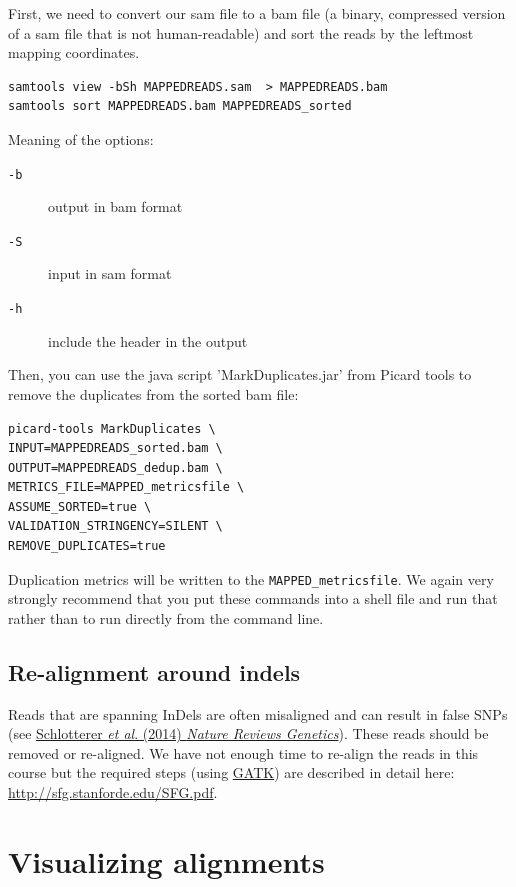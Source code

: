 \documentclass[11pt]{article}
\begin{document}
First, we need to convert our sam file to a bam file (a binary,
compressed version of a sam file that is not human-readable) and sort
the reads by the leftmost mapping coordinates.

\begin{verbatim}
samtools view -bSh MAPPEDREADS.sam  > MAPPEDREADS.bam
samtools sort MAPPEDREADS.bam MAPPEDREADS_sorted
\end{verbatim}

Meaning of the options:
\begin{description}
\item[{\texttt{-b}}] output in bam format
\item[{\texttt{-S}}] input in sam format
\item[{\texttt{-h}}] include the header in the output
\end{description}

Then, you can use the java script 'MarkDuplicates.jar' from Picard
tools to remove the duplicates from the sorted bam file:

\begin{verbatim}
picard-tools MarkDuplicates \
INPUT=MAPPEDREADS_sorted.bam \
OUTPUT=MAPPEDREADS_dedup.bam \
METRICS_FILE=MAPPED_metricsfile \
ASSUME_SORTED=true \
VALIDATION_STRINGENCY=SILENT \
REMOVE_DUPLICATES=true
\end{verbatim}

Duplication metrics will be written to the \texttt{MAPPED\_metricsfile}. We again
very strongly recommend that you put these commands into a shell file and run
that rather than to run directly from the command line.


\subsection{Re-alignment around indels}
\label{sec:orgheadline5}
Reads that are spanning InDels are often misaligned and can result in
false SNPs (see \href{http://www.nature.com/nrg/journal/v15/n11/full/nrg3803.html}{Schlotterer \emph{et al}. (2014) \emph{Nature Reviews
Genetics}}). These reads should be removed or re-aligned. We have not
enough time to re-align the reads in this course but the required
steps (using \href{https://www.broadinstitute.org/gatk/}{GATK}) are described in detail here:
\url{http://sfg.stanforde.edu/SFG.pdf}.

\section{Visualizing alignments}
\label{sec:orgheadline9}
\end{document}
